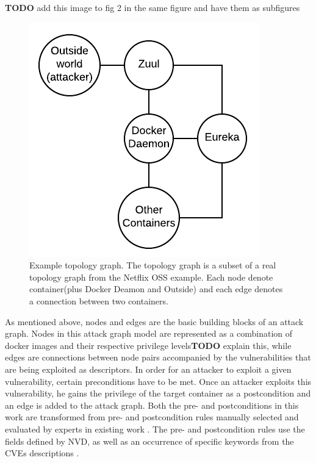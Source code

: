 \textbf{TODO} add this image to fig 2 in the same figure and have them as subfigures\\
\begin{figure}
	\includegraphics[]{./images/Topology_graph}
	\caption{Example topology graph. The topology graph is a subset of a real topology graph from the Netflix OSS example. Each node denote container(plus Docker Deamon and Outside) and each edge denotes a connection between two containers.}
	\label{TopologyGraph}
\end{figure}

As mentioned above, nodes and edges are the basic building blocks of an attack graph. Nodes in this attack graph model are represented as a combination of docker images and their respective privilege levels\textbf{TODO}  explain this, while edges are connections between node pairs accompanied by the vulnerabilities that are being exploited as descriptors. In order for an attacker to exploit a given vulnerability, certain preconditions have to be met. Once an attacker exploits this vulnerability, he gains the privilege of the target container as a postcondition and an edge is added to the attack graph. Both the pre- and postconditions in this work are transformed from pre- and postcondition rules manually selected and evaluated by experts in existing work \cite{aksu2018automated}. The pre- and postcondition rules use the fields defined by NVD, as well as an occurrence of specific keywords from the CVEs descriptions \cite{booth2013national}.


